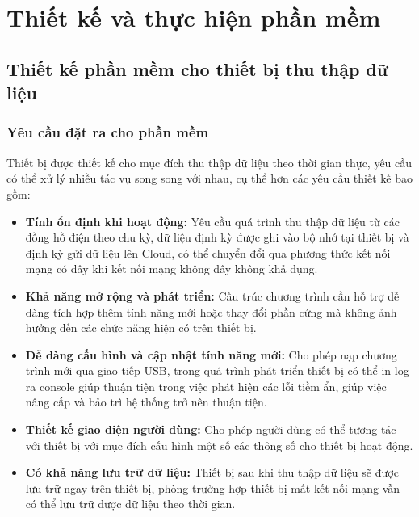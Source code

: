 \chapter{Thiết kế và thực hiện phần mềm}
\section{Thiết kế phần mềm cho thiết bị thu thập dữ liệu}
\subsection{Yêu cầu đặt ra cho phần mềm}
Thiết bị được thiết kế cho mục đích thu thập dữ liệu theo thời gian thực, yêu cầu có thể xử lý nhiều tác vụ 
song song với nhau, cụ thể hơn các yêu cầu thiết kế bao gồm:
\begin{itemize}
    \item \textbf{Tính ổn định khi hoạt động:} Yêu cầu quá trình thu thập dữ liệu từ các đồng hồ điện theo chu 
    kỳ, dữ liệu định kỳ được ghi vào bộ nhớ tại thiết bị và định kỳ gửi dữ liệu lên Cloud, có thể chuyển đổi qua
    phương thức kết nối mạng có dây khi kết nối mạng không dây không khả dụng.
    
    \item \textbf{Khả năng mở rộng và phát triển:} Cấu trúc chương trình cần hỗ trợ dễ dàng tích hợp thêm tính năng mới 
    hoặc thay đổi phần cứng mà không ảnh hưởng đến các chức năng hiện có trên thiết bị.

    \item \textbf{Dễ dàng cấu hình và cập nhật tính năng mới:} Cho phép nạp chương trình mới qua giao tiếp USB, trong quá trình
    phát triển thiết bị có thể in log ra console giúp thuận tiện trong việc phát hiện các lỗi tiềm ẩn, 
    giúp việc nâng cấp và bảo trì hệ thống trở nên thuận tiện.

    \item \textbf{Thiết kế giao diện người dùng:} Cho phép người dùng có thể tương tác với thiết bị với mục đích cấu hình
    một số các thông số cho thiết bị hoạt động.

    \item \textbf{Có khả năng lưu trữ dữ liệu:} Thiết bị sau khi thu thập dữ liệu sẽ được lưu trữ ngay trên thiết bị, phòng
    trường hợp thiết bị mất kết nối mạng vẫn có thể lưu trữ được dữ liệu theo thời gian. 
\end{itemize}

